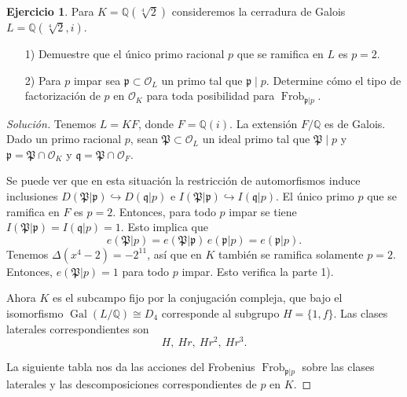 \documentclass{article}
\newcounter{tarea}
\theoremstyle{definition}
\newtheorem{ejercicio}{Ejercicio}[tarea]
\newenvironment{solucion}{\begin{proof}[Solución]}{\end{proof}}
\DeclareMathOperator{\Gal}{Gal}
\DeclareMathOperator{\Frob}{Frob}
\newcommand{\QQ}{\mathbb{Q}}
\renewcommand{\O}{\mathcal{O}}
\begin{document}
\begin{ejercicio}
  Para $K = \QQ (\sqrt[4]{2})$ consideremos la cerradura de Galois
  $L = \QQ (\sqrt[4]{2},i)$.

  \begin{enumerate}
  \item[1)] Demuestre que el único primo racional $p$ que se ramifica en $L$ es
    $p = 2$.

  \item[2)] Para $p$ impar sea $\mathfrak{p} \subset \O_L$ un primo tal que
    $\mathfrak{p} \mid p$. Determine cómo el tipo de factorización de $p$ en
    $\O_K$ para toda posibilidad para $\Frob_{\mathfrak{p}|p}$.
  \end{enumerate}

  \ifdefined\solutions
  \begin{solucion}
    Tenemos $L = KF$, donde $F = \QQ (i)$. La extensión $F/\QQ$ es de
    Galois. Dado un primo racional $p$, sean $\mathfrak{P} \subset \O_L$ un
    ideal primo tal que $\mathfrak{P}\mid p$ y
    $\mathfrak{p} = \mathfrak{P} \cap \O_K$ y
    $\mathfrak{q} = \mathfrak{P} \cap \O_F$.

    Se puede ver que en esta situación la restricción de automorfismos induce
    inclusiones
    $D (\mathfrak{P}|\mathfrak{p}) \hookrightarrow D (\mathfrak{q}|p)$ e
    $I (\mathfrak{P}|\mathfrak{p}) \hookrightarrow I (\mathfrak{q}|p)$.
    El único primo $p$ que se ramifica en $F$ es $p = 2$. Entonces, para todo
    $p$ impar se tiene $I (\mathfrak{P}|\mathfrak{p}) = I (\mathfrak{q}|p) = 1$.
    Esto implica que
    $$e (\mathfrak{P}|p) = e (\mathfrak{P}|\mathfrak{p})\,e (\mathfrak{p}|p) = e (\mathfrak{p}|p).$$
    Tenemos $\Delta (x^4 - 2) = -2^{11}$, así que en $K$ también se ramifica
    solamente $p = 2$. Entonces, $e (\mathfrak{P}|p) = 1$ para todo $p$ impar.
    Esto verifica la parte 1).

    Ahora $K$ es el subcampo fijo por la conjugación compleja, que bajo el
    isomorfismo $\Gal (L/\QQ) \cong D_4$ corresponde al subgrupo
    $H = \{ 1, f \}$. Las clases laterales correspondientes son
    \[ H, ~ H r, ~ H r^2, ~ H r^3. \]

    La siguiente tabla nos da las acciones del Frobenius
    $\Frob_{\mathfrak{p}|p}$ sobre las clases laterales y las descomposiciones
    correspondientes de $p$ en $K$.


\end{solucion}
\end{ejercicio}
\end{document}
